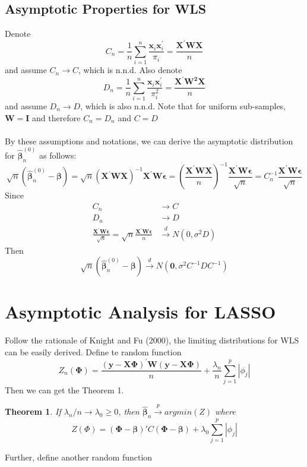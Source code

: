 \documentclass[]{article}
\newtheorem{theorem}{Theorem}
\begin{document}
\subsection{Asymptotic Properties for WLS}
Denote
$$
C_n = \frac{1}{n}\sum_{i=1}^{n}\frac{\boldsymbol{x}_i\boldsymbol{x}_i^{'}}{\pi_i} = \frac{\boldsymbol{X}^{'}\boldsymbol{W}\boldsymbol{X}}{n}
$$ 
and assume $C_n \to C$, which is n.n.d. Also denote
$$
D_n = \frac{1}{n}\sum_{i=1}^{n}\frac{\boldsymbol{x}_i\boldsymbol{x}_i^{'}}{\pi_i^2} = \frac{\boldsymbol{X}^{'}\boldsymbol{W^2}\boldsymbol{X}}{n}
$$
and assume $D_n \to D$, which is also n.n.d. Note that for uniform sub-samples, $\boldsymbol{W} = \boldsymbol{I}$ and therefore $C_n = D_n$ and $C = D$\\
\\
By these assumptions and notations, we can derive the asymptotic distribution for $\hat{\boldsymbol{\beta}}_n^{(0)}$ as follows:
$$
\sqrt{n} (\hat{\boldsymbol{\beta}}_n^{(0)} - \boldsymbol{\beta}) = \sqrt{n}(\boldsymbol{X}^{'}\boldsymbol{W}\boldsymbol{X})^{-1}\boldsymbol{X}^{'}\boldsymbol{W}\boldsymbol{\epsilon} = (\frac{\boldsymbol{X}^{'}\boldsymbol{W}\boldsymbol{X}}{n})^{-1}\frac{\boldsymbol{X}^{'}\boldsymbol{W}\boldsymbol{\epsilon}}{\sqrt{n}} = C_n^{-1}\frac{\boldsymbol{X}^{'}\boldsymbol{W}\boldsymbol{\epsilon}}{\sqrt{n}}
$$ 
Since
\begin{align*}
	C_n &\to C\\
	D_n &\to D\\
	\frac{\boldsymbol{X}^{'}\boldsymbol{W}\boldsymbol{\epsilon}}{\sqrt{n}} = \sqrt{n}\frac{\boldsymbol{X}^{'}\boldsymbol{W}\boldsymbol{\epsilon}}{n} &\xrightarrow{d} N(0, \sigma^2D)
\end{align*}
Then
$$
\sqrt{n} (\hat{\boldsymbol{\beta}}_n^{(0)} - \boldsymbol{\beta}) \xrightarrow{d} N(\boldsymbol{0}, \sigma^2C^{-1}DC^{-1})
$$

\section{Asymptotic Analysis for LASSO}
Follow the rationale of Knight and Fu (2000), the limiting distributions for WLS can be easily derived.
Define te random function
$$
Z_n(\boldsymbol{\Phi}) = \frac{ (\boldsymbol{y} - \boldsymbol{X}\boldsymbol{\Phi})^{'}\boldsymbol{W}(\boldsymbol{y} - \boldsymbol{X}\boldsymbol{\Phi})}{n} + \frac{\lambda_n}{n}\sum_{j=1}^{p}|\phi_j|
$$
Then we can get the Theorem 1.
\begin{theorem}
If $\lambda_n/n \to \lambda_0 \geq 0$, then $\hat{\boldsymbol{\beta}}_n \xrightarrow{p} argmin(Z)$ where
$$
Z(\Phi) = (\boldsymbol{\Phi} - \boldsymbol{\beta})'C(\boldsymbol{\Phi} - \boldsymbol{\beta}) + \lambda_0\sum_{j=1}^{p}|\phi_j|
$$
\end{theorem}
Further, define another random function
\end{document}
